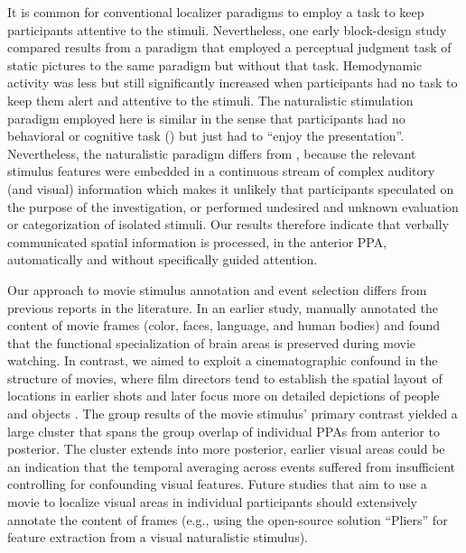 \documentclass[english,11pt]{article}
\begin{document}
It is common for conventional localizer paradigms to employ a task to keep
participants attentive to the stimuli.
Nevertheless, one early block-design study \citep{epstein1998ppa} compared
results from a paradigm that employed a perceptual judgment task of static
pictures to the same paradigm but without that task.
Hemodynamic activity was less but still significantly increased when
participants had no task to keep them alert and attentive to the stimuli.
The naturalistic stimulation paradigm employed here is similar in the sense that
participants had no behavioral or cognitive task (\citep[e.g., forming a mental
image of the stimuli][]{ocraven2000mental})
 but just had to ``enjoy the presentation''.
Nevertheless, the naturalistic paradigm differs from \citet{epstein1998ppa},
because the relevant stimulus features were embedded in a continuous stream of
complex auditory (and visual) information which makes it unlikely that
participants speculated on the purpose of the investigation, or performed
undesired and unknown evaluation or categorization of isolated stimuli.
Our results therefore indicate that verbally communicated spatial information is
processed, in the anterior PPA, automatically and without specifically guided
attention.


Our approach to movie stimulus annotation and event selection differs from
previous reports in the literature.
In an earlier study, \citet{bartels2004mapping} manually annotated the content
of movie frames (color, faces, language, and human bodies) and found that the
functional specialization of brain areas is preserved during movie watching.
%
In contrast, we aimed to exploit a cinematographic confound in the structure of
movies, where
film directors tend to establish the spatial layout of locations in earlier
shots and later focus more on detailed depictions of people and objects
\citep{brown2012cinematography, katz1991film, mascelli1998five}.
The group results of the movie stimulus' primary contrast yielded a large
cluster that spans the group overlap of individual PPAs from anterior to
posterior.
The cluster extends into more posterior, earlier visual areas could be an
indication that the temporal averaging across events suffered from insufficient
controlling for confounding visual features.
Future studies that aim to use a movie to localize visual areas in individual
participants should extensively annotate the content of frames (e.g., using the
open-source solution ``Pliers''\citep{mcnamara2017developing} for feature
extraction from a visual naturalistic stimulus).
\end{document}
